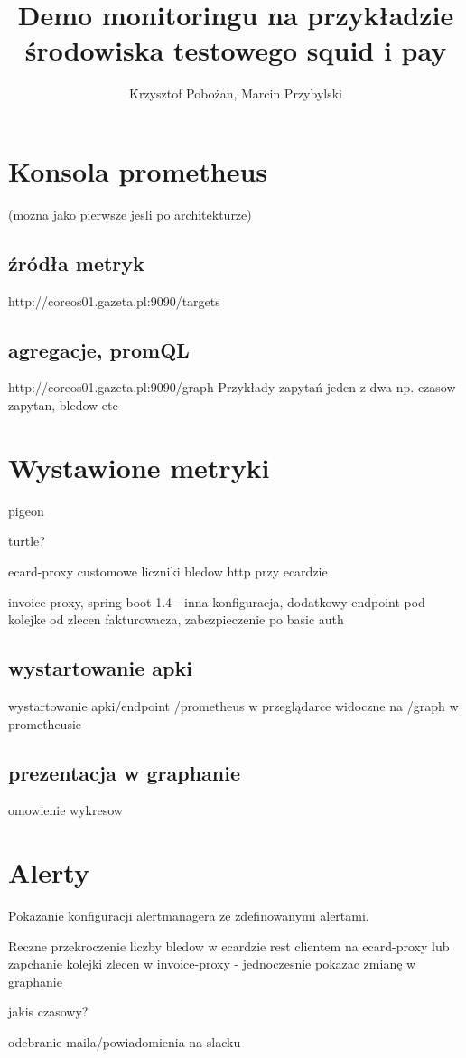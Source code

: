\documentclass[12pt,a4paper,notitlepage,onecolumn]{article}
\author{Krzysztof Pobożan, Marcin Przybylski}
\title{Demo monitoringu na przykładzie środowiska testowego squid i pay}
\begin{document}
	\maketitle
	
	\section{Konsola prometheus}
	(mozna jako pierwsze jesli po architekturze)
	\subsection{źródła metryk}
	http://coreos01.gazeta.pl:9090/targets
	\subsection{agregacje, promQL}
	http://coreos01.gazeta.pl:9090/graph
	Przykłady zapytań jeden z dwa np. czasow zapytan, bledow etc	
	
	\section{Wystawione metryki}
	pigeon
	
	turtle?
	
	ecard-proxy customowe liczniki bledow http przy ecardzie
	
	invoice-proxy, spring boot 1.4 - inna konfiguracja, dodatkowy endpoint pod kolejke od zlecen fakturowacza, zabezpieczenie po basic auth
	
	\subsection{wystartowanie apki}
	wystartowanie apki/endpoint /prometheus w przeglądarce
	widoczne na /graph w prometheusie
	
	\subsection{prezentacja w graphanie}
	omowienie wykresow
	
	
	\section{Alerty}
     Pokazanie konfiguracji alertmanagera ze zdefinowanymi alertami.
     
     Reczne przekroczenie liczby bledow w ecardzie  rest clientem na ecard-proxy lub zapchanie kolejki zlecen w invoice-proxy -
      jednoczesnie pokazac zmianę w graphanie
     
     jakis czasowy?
     
     odebranie maila/powiadomienia na slacku
     
\end{document}
